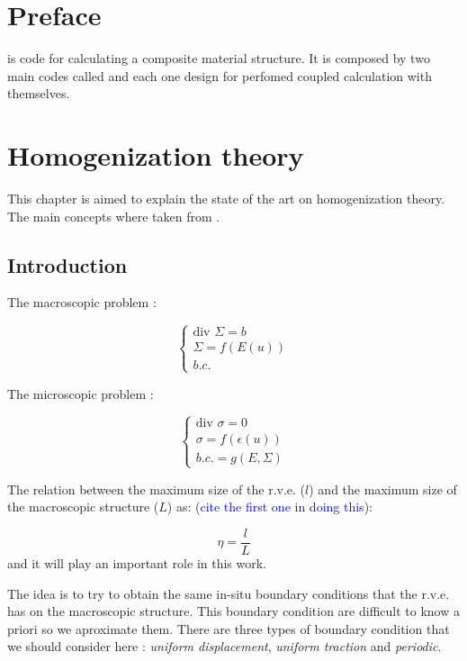 \chapter{Preface}

\par
\sputnik is code for calculating a composite material structure. It is composed by two main codes called \macro and
\micro each one design for perfomed coupled calculation with themselves.

\chapter{Homogenization theory}
This chapter is aimed to explain the state of the art on homogenization theory. The main concepts where taken from
\cite{suquet_1985}.

\section{Introduction}

\begin{figure}[h!]
\resizebox{5cm}{!}{
 
}
\end{figure}

The macroscopic problem :

\[
\begin{cases}
   \text{div } \Sigma =  b\\
   \Sigma = f(E(u))\\
   b.c.
\end{cases}
\]

The microscopic problem :

\[
\begin{cases}
   \text{div } \sigma = 0\\
   \sigma = f(\epsilon(u))\\
   b.c. = g(E , \Sigma) 
\end{cases}
\]

The relation between the maximum size of the r.v.e. ($l$) and the maximum size of the macroscopic 
structure ($L$) as: (\textcolor{blue}{cite the first one in doing this}):

\[
  \eta = \frac{l}{L}
\]
and it will play an important role in this work.

The idea is to try to obtain the same in-situ boundary conditions that the r.v.e. has on the macroscopic 
structure. This boundary condition are difficult to know a priori so we aproximate them.
There are three types of boundary condition that we should consider here : \emph{uniform displacement}, 
\emph{uniform traction} and \emph{periodic}.

